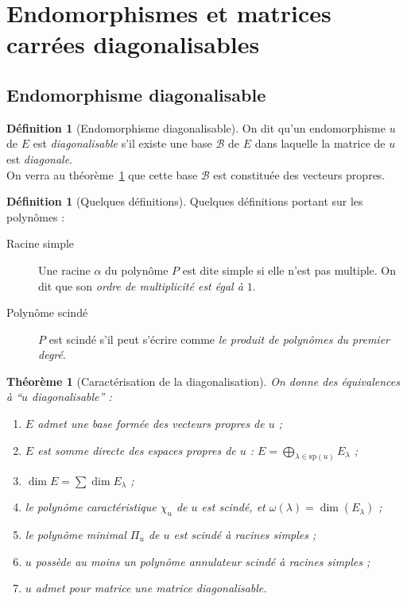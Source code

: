 \documentclass[11pt,a4paper]{report}
\newtheorem{itheorem}[theorem]{Théorème}
\theoremstyle{definition}
\newtheorem{dfn}[theorem]{Définition}
\begin{document}
\section{Endomorphismes et matrices carrées diagonalisables}
\label{sec:diagonalisation}
\subsection{Endomorphisme diagonalisable}
\begin{dfn}[Endomorphisme diagonalisable]
     On dit qu'un endomorphisme $u$ de $E$ est \emph{diagonalisable} s'il existe une base $\mathcal{B}$ de $E$ dans laquelle la matrice de $u$ est \emph{diagonale}.\\
     On verra au théorème~\ref{thm:caracterisation_diagonalisation} que cette base $\mathcal{B}$ est constituée des vecteurs propres.
\end{dfn}
\begin{dfn}[Quelques définitions]
Quelques définitions portant sur les polynômes : 
    \begin{description}
    \item[Racine simple] Une racine $\alpha$ du polynôme $P$ est dite simple si elle n'est pas multiple. On dit que son \emph{ordre de multiplicité est égal à $1$}.
    \item[Polynôme scindé] $P$ est scindé s'il peut s'écrire comme \emph{le produit de polynômes du premier degré}.
    \end{description}
\end{dfn}
\begin{itheorem}[Caractérisation de la diagonalisation]\label{thm:caracterisation_diagonalisation}
    On donne des équivalences à ``$u$ diagonalisable'' : 
    \renewcommand{\theenumi}{\roman{enumi}}%
    \begin{enumerate}
        \item $E$ admet une base formée des vecteurs propres de $u$ ;
        \item $E$ est somme directe des espaces propres de $u$ : $E = \bigoplus_{\lambda\in \mathrm{sp}(u)} E_\lambda$ ;
        \item $\dim E = \sum \dim E_\lambda $ ;
        \item le polynôme caractéristique $\chi_u$ de $u$ est scindé, et $\omega (\lambda ) = \dim (E_\lambda)$ ;
        \item le polynôme minimal $\Pi_u$ de $u$ est scindé à racines simples ;
        \item $u$ possède au moins un polynôme annulateur scindé à racines simples ;
        \item $u$ admet pour matrice une matrice diagonalisable.
    \end{enumerate}
\end{itheorem}
\end{document}
